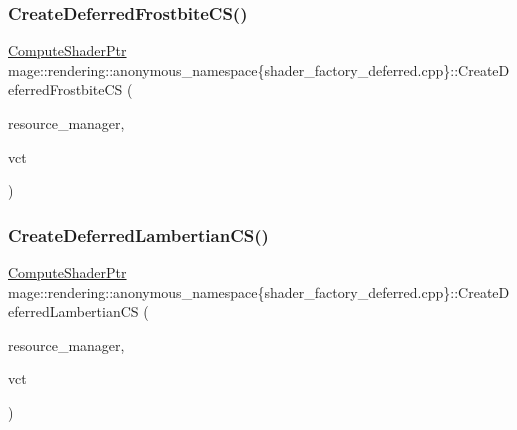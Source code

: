 \subsubsection{\texorpdfstring{Create\+Deferred\+Frostbite\+C\+S()}{CreateDeferredFrostbiteCS()}}
{\footnotesize\ttfamily \mbox{\hyperlink{namespacemage_1_1rendering_ab3dc9f2114f2e9255b91d9c051da52ea}{Compute\+Shader\+Ptr}} mage\+::rendering\+::anonymous\+\_\+namespace\{shader\+\_\+factory\+\_\+deferred.\+cpp\}\+::Create\+Deferred\+Frostbite\+CS (\begin{DoxyParamCaption}\item[{\mbox{\hyperlink{classmage_1_1rendering_1_1_resource_manager}{Resource\+Manager}} \&}]{resource\+\_\+manager,  }\item[{bool}]{vct }\end{DoxyParamCaption})}

\mbox{\label{namespacemage_1_1rendering_1_1anonymous__namespace_02shader__factory__deferred_8cpp_03_a0ee99c5705465b819bfc92c623d4e09f}} 
\subsubsection{\texorpdfstring{Create\+Deferred\+Lambertian\+C\+S()}{CreateDeferredLambertianCS()}}
{\footnotesize\ttfamily \mbox{\hyperlink{namespacemage_1_1rendering_ab3dc9f2114f2e9255b91d9c051da52ea}{Compute\+Shader\+Ptr}} mage\+::rendering\+::anonymous\+\_\+namespace\{shader\+\_\+factory\+\_\+deferred.\+cpp\}\+::Create\+Deferred\+Lambertian\+CS (\begin{DoxyParamCaption}\item[{\mbox{\hyperlink{classmage_1_1rendering_1_1_resource_manager}{Resource\+Manager}} \&}]{resource\+\_\+manager,  }\item[{bool}]{vct }\end{DoxyParamCaption})}

